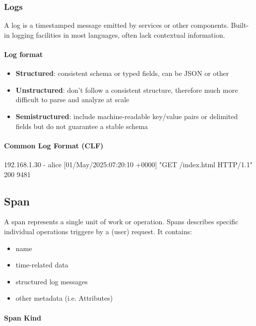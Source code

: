 \subsubsection{Logs}

A log is a timestamped message emitted by services or other
components. Built-in logging facilities in most languages, often lack contextual information.

\paragraph{Log format}


\begin{itemize}
  \item \textbf{Structured}: consistent schema or typed fields, can be JSON or other

  \item \textbf{Unstructured}: don't follow a consistent structure, therefore much more diﬀicult to parse
        and analyze at scale

  \item \textbf{Semistructured}: include machine-readable key/value pairs or delimited fields but do not
        guarantee a stable schema

\end{itemize}

\paragraph{Common Log Format (CLF)} 192.168.1.30 - alice [01/May/2025:07:20:10 +0000] "GET /index.html
HTTP/1.1" 200 9481

\subsection{Span}

A span represents a single unit of work or operation.
Spans describes specific individual operations triggere by a
(user) request. It contains:

\begin{itemize}
  \item name
  \item time-related data
  \item structured log messages
  \item other metadata (i.e. Attributes)
\end{itemize}

\paragraph{Span Kind}

